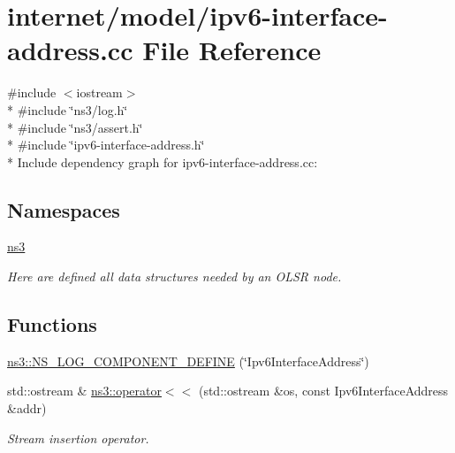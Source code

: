 \hypertarget{ipv6-interface-address_8cc}{}\section{internet/model/ipv6-\/interface-\/address.cc File Reference}
\label{ipv6-interface-address_8cc}
{\ttfamily \#include $<$iostream$>$}\\*
{\ttfamily \#include \char`\"{}ns3/log.\+h\char`\"{}}\\*
{\ttfamily \#include \char`\"{}ns3/assert.\+h\char`\"{}}\\*
{\ttfamily \#include \char`\"{}ipv6-\/interface-\/address.\+h\char`\"{}}\\*
Include dependency graph for ipv6-\/interface-\/address.cc\+:
\subsection*{Namespaces}
\begin{DoxyCompactItemize}
\item 
 \hyperlink{namespacens3}{ns3}
\begin{DoxyCompactList}\small\item\em Here are defined all data structures needed by an O\+L\+SR node. \end{DoxyCompactList}\end{DoxyCompactItemize}
\subsection*{Functions}
\begin{DoxyCompactItemize}
\item 
\hyperlink{namespacens3_a279ede94b490e10b27a929803b46b6ca}{ns3\+::\+N\+S\+\_\+\+L\+O\+G\+\_\+\+C\+O\+M\+P\+O\+N\+E\+N\+T\+\_\+\+D\+E\+F\+I\+NE} (\char`\"{}Ipv6\+Interface\+Address\char`\"{})
\item 
std\+::ostream \& \hyperlink{namespacens3_aad980a26c3c4bc66a2922e83624a88e3}{ns3\+::operator$<$$<$} (std\+::ostream \&os, const Ipv6\+Interface\+Address \&addr)
\begin{DoxyCompactList}\small\item\em Stream insertion operator. \end{DoxyCompactList}\end{DoxyCompactItemize}
